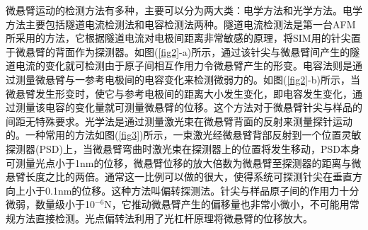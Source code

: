 \documentclass[a4paper]{article}
\begin{document}
微悬臂运动的检测方法有多种，主要可以分为两大类：电学方法和光学方法。电学方法主要包括隧道电流检测法和电容检测法两种。隧道电流检测法是第一台AFM所采用的方法，它根据隧道电流对电极间距离非常敏感的原理，将SIM用的针尖置于微悬臂的背面作为探测器。如图(\ref{fig2}-a)所示，通过该针尖与微悬臂间产生的隧道电流的变化就可检测由于原子间相互作用力令微悬臂产生的形变。电容法则是通过测量微悬臂与一参考电极间的电容变化来检测微弱力的。如图(\ref{fig2}-b)所示，当微悬臂发生形变时，使它与参考电极间的距离大小发生变化，即电容发生变化，通过测量该电容的变化量就可测量微悬臂的位移。这个方法对于微悬臂针尖与样品的间距无特殊要求。光学法是通过测量激光束在微悬臂背面的反射来测量探针运动的。一种常用的方法如图(\ref{fig3})所示，一束激光经微悬臂背部反射到一个位置灵敏探测器(PSD)上，当微悬臂弯曲时激光束在探测器上的位置将发生移动，PSD本身可测量光点小于1nm的位移，微悬臂位移的放大倍数为微悬臂至探测器的距离与微悬臂长度之比的两倍。通常这一比例可以做的很大，使得系统可探测针尖在垂直方向上小于0.1nm的位移。这种方法叫偏转探测法。针尖与样品原子间的作用力十分微弱，数量级小于10$^{-6}$N，它推动微悬臂产生的偏移量也非常小微小，不可能用常规方法直接检测。光点偏转法利用了光杠杆原理将微悬臂的位移放大。
\end{document}
